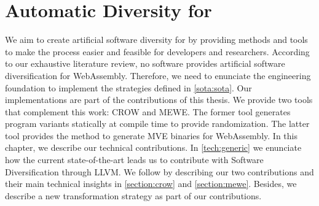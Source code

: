 \chapter{Automatic Diversity for \wasm}
\label{chapter:technical}


We aim to create artificial software diversity for \wasm by providing methods and tools to make the process easier and feasible for developers and researchers. According to our exhaustive literature review, no software provides artificial software diversification for WebAssembly. Therefore, we need to enunciate the engineering foundation to implement the strategies defined in \autoref{sota:sota}. Our implementations are part of the contributions of this thesis. We provide two tools that complement this work: CROW and MEWE. The former tool generates \wasm program variants statically at compile time to provide randomization. The latter tool provides the method to generate MVE binaries for WebAssembly.
In this chapter, we describe our technical contributions. In \autoref{tech:generic} we enunciate how the current state-of-the-art leads us to contribute with Software Diversification through LLVM. We follow by describing our two contributions and their main technical insights in \autoref{section:crow} and \autoref{section:mewe}. Besides, we describe a new transformation strategy as part of our contributions. 















